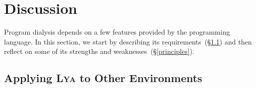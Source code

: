 \documentclass[letterpaper,twocolumn,10pt]{article}
\newcommand{\ttiny}[1]{\texttt{\footnotesize #1}}
\newcommand{\sx}[1]{(\S\ref{#1})}
\newcommand{\sys}{{\scshape Lya}\xspace}
\begin{document}
\section{Discussion}
\label{diss}


Program dialysis depends on a few features provided by the programming language.
In this section, we start by describing its requirements~\sx{reqs} and then reflect on some of its strengths and weaknesses~\sx{principles}.

\subsection{Applying \sys to Other Environments}
\label{reqs}

\end{document}
